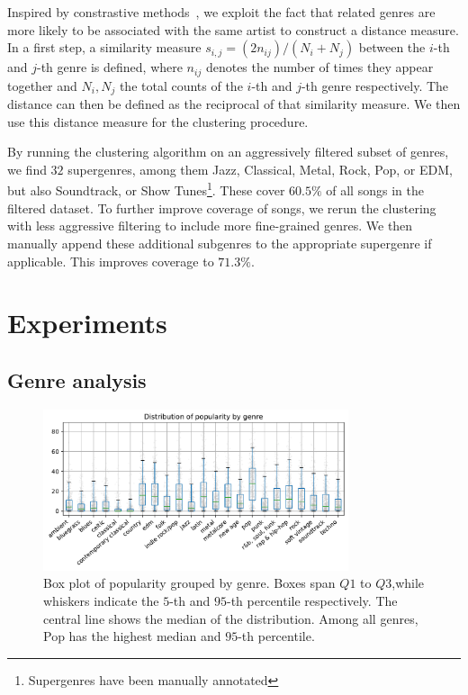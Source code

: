 \documentclass{article}
\begin{document}
Inspired by constrastive methods~\cite{mikolov2013efficient, chen2020simple}, we exploit the fact that related genres are more likely to be associated with the same artist to construct a distance measure. In a first step, a similarity measure $s_{i, j} = (2 n_{ij}) / (N_i + N_j)$ between the $i$-th and $j$-th genre is defined, where $n_{ij}$ denotes the number of times they appear together and $N_i, N_j$ the total counts of the $i$-th and $j$-th genre respectively. The distance can then be defined as the reciprocal of that similarity measure. We then use this distance measure for the clustering procedure.

By running the clustering algorithm on an aggressively filtered subset of genres, we find $32$ supergenres, among them Jazz, Classical, Metal, Rock, Pop, or EDM, but also Soundtrack, or Show Tunes\footnote{Supergenres have been manually annotated}. These cover $60.5\%$ of all songs in the filtered dataset. To further improve coverage of songs, we rerun the clustering with less aggressive filtering to include more fine-grained genres. We then manually append these additional subgenres to the appropriate supergenre if applicable. This improves coverage to $71.3\%$.

\section{Experiments}

\subsection{Genre analysis}

\begin{figure}
  \centering
  \includegraphics[width=0.8\textwidth]{../figures/popularity_distribution_by_genre.pdf}
  \caption{Box plot of popularity grouped by genre. Boxes span $Q1$ to $Q3$,while whiskers indicate the $5$-th and $95$-th percentile respectively. The central line shows the median of the distribution. Among all genres, Pop has the highest median and $95$-th percentile.}
  \label{fig:genre_boxplot}
\end{figure}
\end{document}
